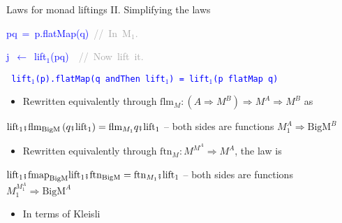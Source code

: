 \documentclass[english]{beamer}
\newenvironment{lyxcode}
  {\par\begin{list}{}{
    \setlength{\rightmargin}{\leftmargin}
    \setlength{\listparindent}{0pt}%
    \raggedright
    \setlength{\itemsep}{0pt}
    \setlength{\parsep}{0pt}
    \normalfont\ttfamily}%
   \def\{{\char`\{}
   \def\}{\char`\}}
   \def\textasciitilde{\char`\~}
   \item[]}
  {\end{list}}
\newcommand{\bef}{\hspace{0.5pt}\ensuremath\mathsmaller{\fatsemi}\hspace{1.5pt}}
\begin{document}
\begin{frame}{Laws for monad liftings II. Simplifying the laws}
\begin{minipage}[t]{0.5\columnwidth}
\begin{lyxcode}
\textcolor{blue}{\footnotesize{}pq~=~p.flatMap(q)~}\textrm{\textcolor{darkgray}{\footnotesize{}//~In~M$_{1}$.}}{\footnotesize\par}

\textcolor{blue}{\footnotesize{}j~$\leftarrow$~lift$_{1}$(pq)}\textrm{\textcolor{darkgray}{\footnotesize{}~~//~Now~lift~it.}}{\footnotesize\par}
\end{lyxcode}
%
\end{minipage}\texttt{\textcolor{blue}{\footnotesize{}\medskip{}
lift$_{1}$(p).flatMap(q andThen lift$_{1}$) = lift$_{1}$(p flatMap
q)}}{\footnotesize\par}
\begin{itemize}
\item Rewritten equivalently through {\footnotesize{}$\text{flm}_{M}:\left(A\Rightarrow M^{B}\right)\Rightarrow M^{A}\Rightarrow M^{B}$}
as
\end{itemize}
\begin{center}
{\footnotesize{}\vspace{-0.2cm}\hspace{-0.0cm}$\text{lift}_{1}\bef\text{flm}_{\text{BigM}}\left(q\bef\text{lift}_{1}\right)=\text{flm}_{M_{1}}q\bef\text{lift}_{1}$
-- both sides are functions $M_{1}^{A}\Rightarrow\text{BigM}^{B}$}{\footnotesize\par}
\par\end{center}
\begin{itemize}
\item {\footnotesize{}\vspace{-0.3cm}\hspace{-0.0cm}}Rewritten equivalently
through {\footnotesize{}$\text{ftn}_{M}:M^{M^{A}}\Rightarrow M^{A}$,}
the law is
\end{itemize}
\begin{center}
{\footnotesize{}\vspace{-0.2cm}\hspace{-0.0cm}$\text{lift}_{1}\bef\text{fmap}_{\text{BigM}}\text{lift}_{1}\bef\text{ftn}_{\text{BigM}}=\text{ftn}_{M_{1}}\bef\text{lift}_{1}$
-- both sides are functions $M_{1}^{M_{1}^{A}}\Rightarrow\text{BigM}^{A}$}{\footnotesize\par}
\par\end{center}
\begin{itemize}
\item {\footnotesize{}\vspace{-0.3cm}\hspace{-0.0cm}}In terms of Kleisli

\end{itemize}
\end{frame}
\end{document}
